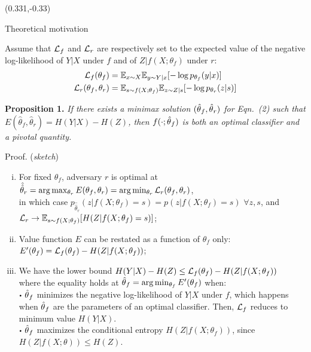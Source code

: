 \documentclass[final,unknownkeysallowed]{beamer}
\newcommand\sbullet[1][.5]{\mathbin{\vcenter{\hbox{\scalebox{#1}{$\bullet$}}}}}
\begin{document}
\begin{frame}{}
\begin{textblock}{0.32}(0.331,-0.33)

\begin{block}{Theoretical motivation \phantom{p}}

Assume that ${\cal L}_f$ and ${\cal L}_r$  are respectively set to the
expected value of the
negative log-likelihood of $Y|X$ under $f$ and of $Z|f(X;\theta_f)$ under
$r$:
\begin{align}
    {\cal L}_f(\theta_f) &= \mathbb{E}_{x \sim X}  \mathbb{E}_{y \sim Y|x} [ -\log p_{\theta_f} (y|x) ]  \\
    {\cal L}_r(\theta_f, \theta_r) &= \mathbb{E}_{s \sim f(X;\theta_f)}  \mathbb{E}_{z \sim Z|s} [-\log p_{\theta_r} (z|s)]
\end{align}

\begin{shaded}
\textbf{Proposition 1.}
\textit{If there exists a minimax solution $(\smash{\hat\theta}_f, \smash{\hat\theta}_r)$
for Eqn.~(2) such that
$E(\hat\theta_f, \hat\theta_r) = H({Y|X}) - H(Z)$, then
$f(\cdot;\smash{\hat\theta}_f)$ is both an optimal classifier and a pivotal
quantity.}
\end{shaded}

Proof. (\textit{sketch})\\
\begin{enumerate}[(i)]
\item For fixed $\theta_f$, adversary $r$ is optimal at $\hat{\hat\theta}_r = \arg \max_{\theta_r} E(\theta_f, \theta_r)  = \arg \min_{\theta_r} {\cal L}_r(\theta_f, \theta_r)$,\\
in which case $p_{\hat{\hat\theta}_r}(z|f(X;\theta_f)=s) = p(z|f(X;\theta_f)=s)$ $\forall z, s$, and\\
${\cal L}_r \to \mathbb{E}_{s \sim f(X;\theta_f)} [ H({Z|f(X;\theta_f)=s}) ]$;

\item Value function $E$ can be restated as a function of $\theta_f$ only: \\
$E'(\theta_f) = {\cal L}_f(\theta_f) -  H({Z|f(X;\theta_f)})$;

\item We have the lower bound $H({Y|X}) - H(Z) \leq {\cal L}_f(\theta_f) - H({Z|f(X;\theta_f)})$ \\
where the equality holds at $\smash{\hat\theta}_f = \arg \min_{\theta_f} E'(\theta_f)$ when: \\
 $\sbullet$ $\smash{\hat\theta}_f$ minimizes the negative log-likelihood of $Y|X$ under $f$,
    which happens when $\smash{\hat\theta}_f$ are the parameters
    of an optimal classifier. Then, ${\cal L}_f$ reduces to
    minimum value $H({Y|X})$. \\
  $\sbullet$ $\smash{\hat\theta}_f$ maximizes the conditional entropy
    $H({Z|f(X;\theta_f)})$, since $H(Z|f(X;\theta)) \leq H(Z)$.
\end{enumerate}



\end{block}
\end{textblock}
\end{frame}
\end{document}
